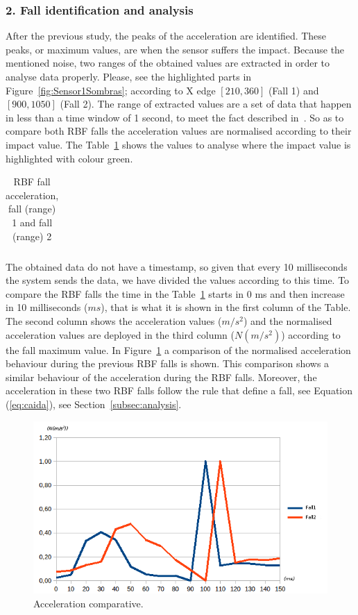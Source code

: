 \documentclass[review]{elsarticle}
\begin{document}
\subsubsection*{2. Fall identification and analysis} After the previous study, the peaks of the acceleration are identified. 
These peaks, or maximum values, are when the sensor suffers the impact. Because the mentioned noise, two ranges of the obtained 
values are extracted in order to analyse data properly. Please, see the highlighted parts in Figure~\ref{fig:Sensor1Sombras};
according to X edge $[210, 360]$ (Fall 1) and $[900, 1050]$ (Fall 2). The range of extracted values are a set of data that 
happen in less than a time window of 1 second, to meet the fact described in~\cite{Luder2009}. So as to compare both RBF falls
the acceleration values are normalised according to their impact value. The Table~\ref{tabla:RBF} 
shows the values to analyse where the impact value is highlighted with colour green.

\begin{table}[!ht]
 \centering
 \begin{tabular}{*{5}{r}}
   
 \end{tabular}
 \caption{RBF fall acceleration, fall (range) 1 and fall (range) 2}%
 \label{tabla:RBF}
\end{table}

The obtained data do not have a timestamp, so given that every 10 milliseconds the system sends the data, we have
divided the values according to this time. To compare the RBF falls the time in the Table~\ref{tabla:RBF} 
starts in 0 ms and then increase in 10 milliseconds ($ms$), that is what it is shown in 
the first column of the Table. The second column shows the acceleration values ($m/s^2$) and the normalised acceleration values
are deployed in the third column ($N(m/s^2)$) according to the fall maximum value. In 
Figure~\ref{fig:Sensor1} a comparison of the normalised acceleration behaviour during the previous RBF falls is shown. 
This comparison shows a similar behaviour of the acceleration during the RBF falls.
Moreover, the acceleration in these two RBF falls follow the rule that define a fall, see Equation (\ref{eq:caida}), 
see Section~\ref{subsec:analysis}.

\begin{figure}[!ht]
  \centering
  \includegraphics[scale=0.5]{img/Comparativa}
  \caption[Acceleration comparative]{Acceleration comparative.}
  \label{fig:Sensor1}
\end{figure}
\end{document}
